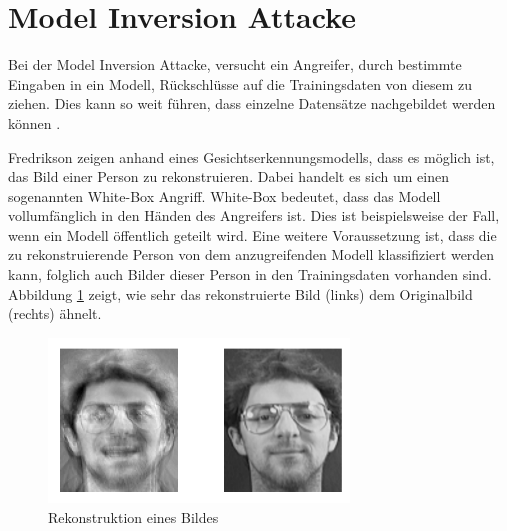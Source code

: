 \section{Model Inversion Attacke}\label{sec:model_inversion}

Bei der Model Inversion Attacke, versucht ein Angreifer, durch bestimmte Eingaben in ein Modell, Rückschlüsse auf die Trainingsdaten von diesem zu ziehen. 
Dies kann so weit führen, dass einzelne Datensätze nachgebildet werden können \cite{P-3}. 

Fredrikson \etal \cite{P-3} zeigen anhand eines Gesichtserkennungsmodells, dass es möglich ist, das Bild einer Person zu rekonstruieren.
Dabei handelt es sich um einen sogenannten White-Box Angriff.
White-Box bedeutet, dass das Modell vollumfänglich in den Händen des Angreifers ist.
Dies ist beispielsweise der Fall, wenn ein Modell öffentlich geteilt wird.
Eine weitere Voraussetzung ist, dass die zu rekonstruierende Person von dem anzugreifenden Modell klassifiziert werden kann, folglich auch Bilder dieser Person in den Trainingsdaten vorhanden sind.
Abbildung \ref{fig:mi_attacke} zeigt, wie sehr das rekonstruierte Bild (links) dem Originalbild (rechts) ähnelt.

\begin{figure}[!htb]
    \centering
    \includegraphics[width=8cm]{figures/mi_attack}
    \caption{Rekonstruktion eines Bildes \cite{P-3}}
    \label{fig:mi_attacke}
\end{figure} 

